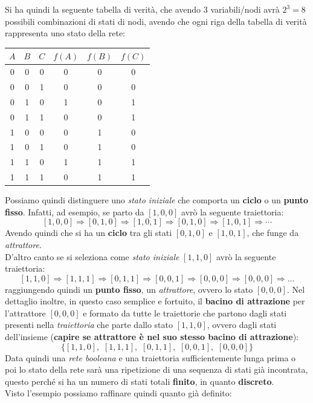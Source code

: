 \documentclass[a4paper,12pt, oneside]{book}
\begin{document}
Si ha quindi la seguente tabella di verità, che avendo $3$ variabili/nodi avrà
$2^3=8$ possibili combinazioni di stati di nodi, avendo che ogni riga della
tabella di verità rappresenta uno stato della rete:
\begin{table}[H]
  \centering
  \begin{tabular}{c|c|c||c|c|c}
    $A$&$B$&$C$&$f(A)$ & $f(B)$ & $f(C)$\\
    \hline
    0 & 0 & 0 & 0 & 0 & 0\\
    0 & 0 & 1 & 0 & 0 & 0\\
    0 & 1 & 0 & 1 & 0 & 1\\
    0 & 1 & 1 & 0 & 0 & 1\\
    1 & 0 & 0 & 0 & 1 & 0\\
    1 & 0 & 1 & 0 & 1 & 0\\
    1 & 1 & 0 & 1 & 1 & 1\\
    1 & 1 & 1 & 0 & 1 & 1\\
  \end{tabular}
\end{table}
Possiamo quindi distinguere uno \textit{stato iniziale} che comporta un
\textbf{ciclo} o un \textbf{punto fisso}. Infatti, ad esempio, se parto da
$[1,0,0]$ avrò la seguente traiettoria: 
\[[1,0,0]\Rightarrow [0,1,0]\Rightarrow [1,0,1] \Rightarrow [0,1,0]\Rightarrow
  [1,0,1]\Rightarrow\cdots\]
Avendo quindi che si ha un \textbf{ciclo} tra gli stati $[0,1,0]$ e $[1,0,1]$,
che funge da \textit{attrattore}.\\
D'altro canto se si seleziona come \textit{stato iniziale} $[1,1,0]$ avrò la
seguente traiettoria:
\[[1,1,0]\Rightarrow[1,1,1]\Rightarrow[0,1,1]\Rightarrow[0,0,1]
  \Rightarrow[0,0,0]\Rightarrow[0,0,0]\Rightarrow\ldots\]
raggiungendo quindi un \textbf{punto fisso}, un \textit{attrattore}, ovvero lo
stato $[0,0,0]$. Nel dettaglio inoltre, in questo caso semplice e fortuito, il
\textbf{bacino di attrazione} per l'attrattore $[0,0,0]$ e formato da tutte le
traiettorie che partono dagli
stati presenti nella \textit{traiettoria} che parte dallo stato $[1,1,0]$,
ovvero dagli stati dell'insieme (\textbf{capire se attrattore è nel suo stesso
  bacino di attrazione}): 
\[\{[1,1,0],\,\,[1,1,1],\,\,[0,1,1],\,\,[0,0,1],\,\,[0,0,0]\}\]
Data quindi una \textit{rete booleana} e una traiettoria sufficientemente lunga
prima o poi lo stato della rete sarà una ripetizione di una sequenza di stati
già incontrata, questo perché si ha un numero di stati totali \textbf{finito},
in quanto \textbf{discreto}.\\
Visto l'esempio possiamo raffinare quindi quanto già definito:
\end{document}
